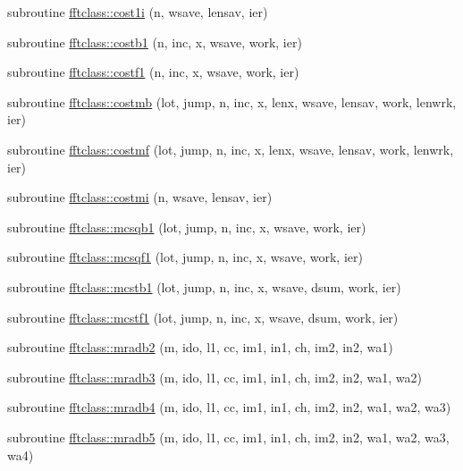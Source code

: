 \begin{DoxyCompactItemize}
subroutine \mbox{\hyperlink{namespacefftclass_aa0605a45256c5ff2bfcd9229dd8854e4}{fftclass\+::cost1i}} (n, wsave, lensav, ier)
\item 
subroutine \mbox{\hyperlink{namespacefftclass_a2769de58926e8dc80c0fa9f862de7dce}{fftclass\+::costb1}} (n, inc, x, wsave, work, ier)
\item 
subroutine \mbox{\hyperlink{namespacefftclass_af419be9c656e387f89facc1033cf4f55}{fftclass\+::costf1}} (n, inc, x, wsave, work, ier)
\item 
subroutine \mbox{\hyperlink{namespacefftclass_a1bb83e3c96bf08b2789acf52feef22b8}{fftclass\+::costmb}} (lot, jump, n, inc, x, lenx, wsave, lensav, work, lenwrk, ier)
\item 
subroutine \mbox{\hyperlink{namespacefftclass_a04e4666f4382e42cf8e63ee5c44fc61a}{fftclass\+::costmf}} (lot, jump, n, inc, x, lenx, wsave, lensav, work, lenwrk, ier)
\item 
subroutine \mbox{\hyperlink{namespacefftclass_a4e2ea9d14ac7ed425be8cb1fd1ed8ddf}{fftclass\+::costmi}} (n, wsave, lensav, ier)
\item 
subroutine \mbox{\hyperlink{namespacefftclass_a91e23ffaebaadf2b1c22e689f69996a2}{fftclass\+::mcsqb1}} (lot, jump, n, inc, x, wsave, work, ier)
\item 
subroutine \mbox{\hyperlink{namespacefftclass_a05d00644e8642979b2c55b7822bbfb03}{fftclass\+::mcsqf1}} (lot, jump, n, inc, x, wsave, work, ier)
\item 
subroutine \mbox{\hyperlink{namespacefftclass_a10f96df2a58ce7f2e6ac9eaddf09588e}{fftclass\+::mcstb1}} (lot, jump, n, inc, x, wsave, dsum, work, ier)
\item 
subroutine \mbox{\hyperlink{namespacefftclass_aac5cdc09f4e9979eb972972e1db55cb3}{fftclass\+::mcstf1}} (lot, jump, n, inc, x, wsave, dsum, work, ier)
\item 
subroutine \mbox{\hyperlink{namespacefftclass_a39691ebdf781bf380b7ef426f4027896}{fftclass\+::mradb2}} (m, ido, l1, cc, im1, in1, ch, im2, in2, wa1)
\item 
subroutine \mbox{\hyperlink{namespacefftclass_a493cf432cfe190657e9a56a0d452b275}{fftclass\+::mradb3}} (m, ido, l1, cc, im1, in1, ch, im2, in2, wa1, wa2)
\item 
subroutine \mbox{\hyperlink{namespacefftclass_a5aae50728c25b5089b6b3c61d3ef27eb}{fftclass\+::mradb4}} (m, ido, l1, cc, im1, in1, ch, im2, in2, wa1, wa2, wa3)
\item 
subroutine \mbox{\hyperlink{namespacefftclass_a69781205c1568e37470a06e001a0dae7}{fftclass\+::mradb5}} (m, ido, l1, cc, im1, in1, ch, im2, in2, wa1, wa2, wa3, wa4)

\end{DoxyCompactItemize}
